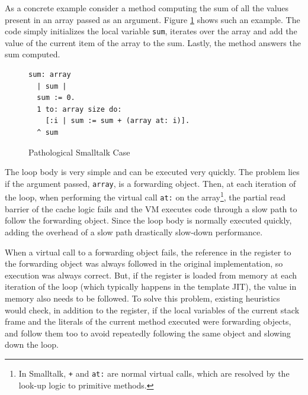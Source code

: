 \documentclass[sigplan,10pt,review,anonymous]{acmart}\settopmatter{printfolios=true,printccs=false,printacmref=false}
\begin{document}

As a concrete example consider a method computing the sum of all the values present in an array passed as an argument. Figure \ref{fig:code} shows such an example. The code simply initializes the local variable \texttt{sum}, iterates over the array and add the value of the current item of the array to the sum. Lastly, the method answers the sum computed. 

\begin{figure}[bth]
		\vspace{-0.1cm}
\begin{verbatim}
sum: array
  | sum |
  sum := 0.
  1 to: array size do: 
    [:i | sum := sum + (array at: i)].
  ^ sum
\end{verbatim}
		\vspace{-0.3cm}
		\caption{Pathological Smalltalk Case\vspace{-0.3cm}}
		\label{fig:code}
 \end{figure}

The loop body is very simple and can be executed very quickly. The problem lies if the argument passed, \texttt{array}, is a forwarding object. Then, at each iteration of the loop, when performing the virtual call \texttt{at:} on the array\footnote{In Smalltalk, \texttt{+} and \texttt{at:} are normal virtual calls, which are resolved by the look-up logic to primitive methods.}, the partial read barrier of the cache logic fails and the VM executes code through a slow path to follow the forwarding object. Since the loop body is normally executed quickly, adding the overhead of a slow path drastically slow-down performance. 

When a virtual call to a forwarding object fails, the reference in the register to the forwarding object was always followed in the original implementation, so execution was always correct. But, if the register is loaded from memory at each iteration of the loop (which typically happens in the template JIT), the value in memory also needs to be followed. %
To solve this problem, existing heuristics would check, in addition to the register, if the local variables of the current stack frame and the literals of the current method executed were forwarding objects, and follow them too to avoid repeatedly following the same object and slowing down the loop.
\end{document}
